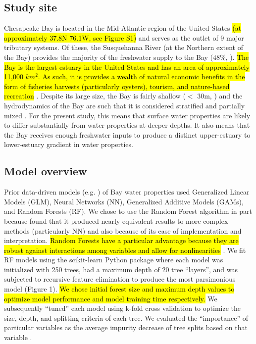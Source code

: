 \documentclass{article}
\begin{document}
\subsection{Study site}

Chesapeake Bay is located in the Mid-Atlantic region of the United States \hl{(at approximately 37.8\degree N 76.1\degree W, see Figure S1)} and serves as the outlet of 9 major tributary systems. Of these, the Susquehanna River (at the Northern extent of the Bay) provides the majority of the freshwater supply to the Bay (\texttildelow$48\%$, \cite{xuClimateForcingSalinity2012}). \hl{The Bay is the largest estuary in the United States and has an area of approximately 11,000 $km^2$. As such, it is provides a wealth of natural economic benefits in the form of fisheries harvests (particularly oysters), tourism, and nature-based recreation} \cite{hoodChesapeakeBayProgram2021}. Despite its large size, the Bay is fairly shallow ($<$ 30m, \cite{murphyComparisonSpatialInterpolation2010}) and the hydrodynamics of the Bay are such that it is considered stratified and partially mixed \cite{xuClimateForcingSalinity2012}. For the present study, this means that surface water properties are likely to differ substantially from water properties at deeper depths. It also means that the Bay receives enough freshwater inputs to produce a distinct upper-estuary to lower-estuary gradient in water properties.

\subsection{Model overview}

Prior data-driven models (e.g. \cite{urquhartGeospatialInterpolationMODISderived2013, vogelAssessingSatelliteSea2016}) of Bay water properties used Generalized Linear Models (GLM), Neural Networks (NN), Generalized Additive Models (GAMs), and Random Forests (RF). We chose to use the Random Forest algorithm in part because \cite{urquhartGeospatialInterpolationMODISderived2013} found that it produced nearly equivalent results to more complex methods (particularly NN) and also because of its ease of implementation and interpretation. \hl{Random Forests have a particular advantage because they are robust against interactions among variables and allow for nonlinearities} \cite{prasadNewerClassificationRegression2006}. We fit RF models using the scikit-learn Python package \cite{pedregosaScikitlearnMachineLearning2011} where each model was initialized with 250 trees, had a maximum depth of 20 tree “layers”, and was subjected to recursive feature elimination to produce the most parsimonious model (Figure 1). \hl{We chose initial forest size and maximum depth values to optimize model performance and model training time respectively.} We subsequently “tuned” each model using k-fold cross validation to optimize the size, depth, and splitting criteria of each tree. We evaluated the “importance” of particular variables as the average impurity decrease of tree splits based on that variable \cite{pedregosaScikitlearnMachineLearning2011}.
\end{document}
